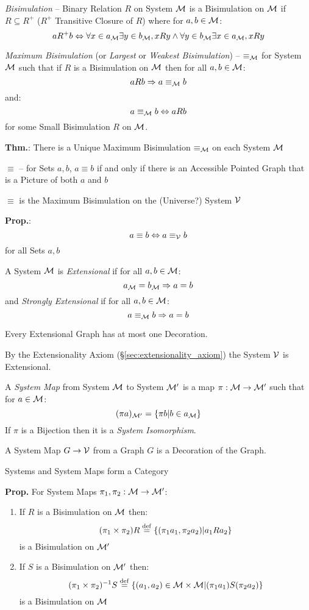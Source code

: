 \emph{Bisimulation} -- Binary Relation $R$ on System $\mathcal{M}$ is a
Bisimulation on $\mathcal{M}$ if $R \subseteq R^+$ ($R^+$ Transitive
Closure of $R$) where for $a,b \in \mathcal{M}$:
\[
  a R^+ b \Leftrightarrow \forall x \in a_\mathcal{M}
    \exists y \in b_\mathcal{M}, x R y \wedge
    \forall y \in b_\mathcal{M} \exists x \in a_\mathcal{M}, x R y
\]

\emph{Maximum Bisimulation} (or \emph{Largest} or \emph{Weakest
  Bisimulation}) -- $\equiv_\mathcal{M}$ for System $\mathcal{M}$ such
that if $R$ is a Bisimulation on $\mathcal{M}$ then for all $a,b \in
\mathcal{M}$:
\[
  a R b \Rightarrow a \equiv_\mathcal{M} b
\]
and:
\[
  a \equiv_\mathcal{M} b \Leftrightarrow a R b
\]
for some Small Bisimulation $R$ on $\mathcal{M}$.

\textbf{Thm.}: There is a Unique Maximum Bisimulation
$\equiv_\mathcal{M}$ on each System $\mathcal{M}$

$\equiv$ -- for Sets $a,b$, $a \equiv b$ if and only if there is an
Accessible Pointed Graph that is a Picture of both $a$ and $b$

$\equiv$ is the Maximum Bisimulation on the (Universe?) System
$\mathcal{V}$ %

\textbf{Prop.}:
\[
  a \equiv b \Leftrightarrow a \equiv_\mathcal{V} b
\]
for all Sets $a,b$

A System $\mathcal{M}$ is \emph{Extensional} if for all $a,b \in
\mathcal{M}$:
\[
  a_\mathcal{M} = b_\mathcal{M} \Rightarrow a = b
\]
and \emph{Strongly Extensional} if for all $a,b \in \mathcal{M}$:
\[
  a \equiv_\mathcal{M} b \Rightarrow a = b
\]

Every Extensional Graph has at most one Decoration.

By the Extensionality Axiom (\S\ref{sec:extensionality_axiom}) the
System $\mathcal{V}$ is Extensional.

A \emph{System Map} from System $\mathcal{M}$ to System $\mathcal{M}'$ is
a map $\pi : \mathcal{M} \rightarrow \mathcal{M}'$ such that for $a \in
\mathcal{M}$:
\[
  (\pi a)_{\mathcal{M}'} = \{ \pi b | b \in a_\mathcal{M} \}
\]
If $\pi$ is a Bijection then it is a \emph{System Isomorphism}.

A System Map $G \rightarrow \mathcal{V}$ from a Graph $G$ is a
Decoration of the Graph.

Systems and System Maps form a Category %

\textbf{Prop.} For System Maps $\pi_1,\pi_2 : \mathcal{M} \rightarrow
\mathcal{M}'$:
\begin{enumerate}
  \item If $R$ is a Bisimulation on $\mathcal{M}$ then:
    \[
      (\pi_1 \times \pi_2) R
        \stackrel{\mathrm{def}}= \{(\pi_1 a_1, \pi_2 a_2) | a_1 R a_2\}
    \]
    is a Bisimulation on $\mathcal{M}'$
  \item If $S$ is a Bisimulation on $\mathcal{M}'$ then:
    \[
      (\pi_1 \times \pi_2)^{-1}S
        \stackrel{\mathrm{def}}= \{(a_1,a_2) \in \mathcal{M} \times \mathcal{M}
        | (\pi_1 a_1) S (\pi_2 a_2)\}
    \]
    is a Bisimulation on $\mathcal{M}$
\end{enumerate}

